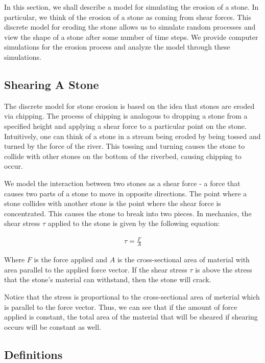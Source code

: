 In this section, we shall describe a model for simulating the erosion of a stone. In particular, we think of the erosion of a stone as coming from shear forces. This discrete model for eroding the stone allows us to simulate random processes and view the shape of a stone after some number of time steps. We provide computer simulations for the erosion process and analyze the model through these simulations.

\subsection{Shearing A Stone}

The discrete model for stone erosion is based on the idea that stones are eroded via chipping. The process of chipping is analogous to dropping a stone from a specified height and applying a shear force to a particular point on the stone. Intuitively, one can think of a stone in a stream being eroded by being tossed and turned by the force of the river. This tossing and turning causes the stone to collide with other stones on the bottom of the riverbed, causing chipping to occur.

We model the interaction between two stones as a shear force - a force that causes two parts of a stone to move in opposite directions. The point where a stone collides with another stone is the point where the shear force is concentrated. This causes the stone to break into two pieces. In mechanics, the shear stress $\tau$ applied to the stone is given by the following equation:

\begin{eqnarray}
  \tau = \frac{F}{A}
\end{eqnarray}

Where $F$ is the force applied and $A$ is the cross-sectional area of material with area parallel to the applied force vector. If the shear stress $\tau$ is above the stress that the stone's material can withstand, then the stone will crack.

Notice that the stress is proportional to the cross-sectional area of meterial which is parallel to the force vector. Thus, we can see that if the amount of force applied is constant, the total area of the material that will be sheared if shearing occurs will be constant as well.

\subsection{Definitions}

